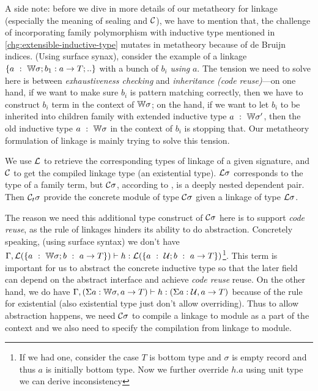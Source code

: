 A side note: before we dive in more details of our metatheory for linkage (especially the meaning of sealing and ${\mathcal{C}}$), we have to mention that, the challenge of incorporating family polymorphism with inductive type mentioned in \ref{chg:extensible-inductive-type} mutates in metatheory because of de Bruijn indices. (Using surface synax), consider the example of a linkage $\{a~:~{\mathbb{W}} \sigma; b_1 : a \to T;..\}$ with a bunch of $b_i$ \textit{using} $a$. The tension we need to solve here is between \textit{exhaustiveness checking} and \textit{inheritance (code reuse)}---on one hand, if we want to make sure $b_i$ is pattern matching correctly, then we have to construct $b_i$ term in the context of ${\mathbb{W}}\sigma$; on the hand, if we want to let $b_i$ to be inherited into children family with extended inductive type $a~:~{\mathbb{W}} \sigma'$, then the old inductive type $a~:~{\mathbb{W}} \sigma$ in the context of $b_i$ is stopping that. Our metatheory formulation of linkage is mainly trying to solve this tension.



We use ${\mathcal{L}}$ to retrieve the corresponding types of linkage of a given signature, and ${\mathcal{C}}$ to get the compiled linkage type (an existential type).
${\mathcal{L}}\sigma$ corresponds to the type of a family term, but ${\mathcal{C}}\sigma$, according to , is a deeply nested dependent pair. Then ${\mathcal{C}_t} \sigma$ provide the concrete module of type ${\mathcal{C}}\sigma$ given a linkage of type ${\mathcal{L}}\sigma$. 

The reason we need this additional type construct of ${\mathcal{C}}\sigma$ here is to support \textit{code reuse}, as the rule of linkages hinders its ability to do abstraction. Concretely speaking, (using surface syntax) we don't have \\ ${ {\Gamma, {\mathcal{L}}(\{a~:~{\mathbb{W}} \sigma; b~:~a \to T\})} \vdash {h} : {{\mathcal{L}}(\{a~:~{\mathcal{U}}; b~:~a \to T\})} }$\footnote{If we had one, consider the case $T$ is bottom type and $\sigma$ is empty record and thus $a$ is initially bottom type. Now we further override $h.a$ using unit type we can derive inconsistency}. This term is important for us to abstract the concrete inductive type so that the later field can depend on the abstract interface and achieve \textit{code reuse} reuse. On the other hand, we do have ${ {\Gamma, (\Sigma a : {\mathbb{W}}\sigma, a \to T) } \vdash {h} : {(\Sigma a : {\mathcal{U}}, a \to T)} }$ because of the rule for existential (also existential type just don't allow overriding). Thus to allow abstraction happens, we need  ${\mathcal{C}}\sigma$ to compile a linkage to module as a part of the context and we also need  to specify the compilation from linkage to module.

